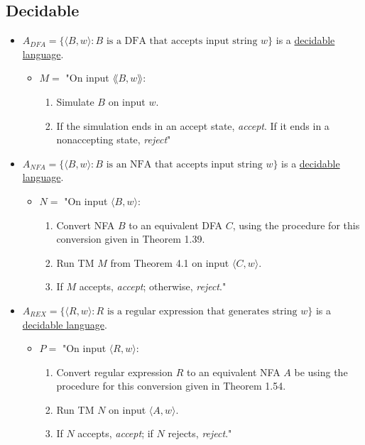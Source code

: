 \documentclass[12pt]{article}
\begin{document}
\subsection{Decidable}
\label{sec:orgd05dfc7}
\begin{itemize}
\item \(A_{DFA}=\{\langle B,w \rangle : B \text{ is a DFA that accepts input string }
   w\}\) is a \uline{decidable language}.
\begin{itemize}
\item \(M=\) "On input \(\lang B,w \rang\):
\begin{enumerate}
\item Simulate \(B\) on input \(w\).
\item If the simulation ends in an accept state, \emph{accept}. If it ends in a
nonaccepting state, \emph{reject}"
\end{enumerate}
\end{itemize}

\item \(A_{NFA}=\{\langle{}B,w\rangle : B \text{ is an NFA that accepts input
   string } w\}\) is a \uline{decidable language}.
\begin{itemize}
\item \(N=\) "On input \(\langle B,w \rangle\):
\begin{enumerate}
\item Convert NFA \(B\) to an equivalent DFA \(C\), using the procedure for this
conversion given in Theorem 1.39.
\item Run TM \(M\) from Theorem 4.1 on input \(\langle C,w \rangle\).
\item If \(M\) accepts, \emph{accept}; otherwise, \emph{reject}."
\end{enumerate}
\end{itemize}

\item \(A_{REX}=\{\langle{}R,w\rangle : R \text{ is a regular expression that
   generates string } w\}\) is a \uline{decidable language}.
\begin{itemize}
\item \(P=\) "On input \(\langle R,w \rangle\):
\begin{enumerate}
\item Convert regular expression \(R\) to an equivalent NFA \(A\) be using the
procedure for this conversion given in Theorem 1.54.
\item Run TM \(N\) on input \(\langle{}A,w\rangle\).
\item If \(N\) accepts, \emph{accept}; if \(N\) rejects, \emph{reject}."
\end{enumerate}
\end{itemize}


\end{itemize}
\end{document}
